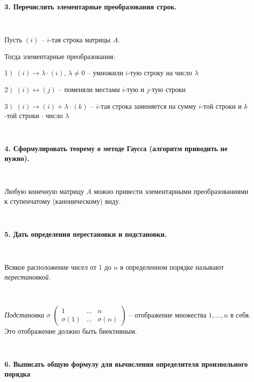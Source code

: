 \documentclass{article}
\begin{document}
    \textbf{3. Перечислить элементарные преобразования строк.}

    {
        $\;$
        \setlength{\parindent}{0.4cm}
        \hangindent=0.4cm

    Пусть $(i)$ -- $i$-тая строка матрицы $A$.

    Тогда элементарные преобразования:

    1$\left.\right)$ $(i)\rightarrow\lambda\cdot(i)$, $ \lambda\ne 0$ --
    умножили $i$-тую строку на число $\lambda$

        2$\left.\right)$ $(i)\leftrightarrow (j)$ -- поменяли местами $i$-тую и $j$-тую строки

    3$\left.\right)$ $(i)\rightarrow (i)+\lambda\cdot(k)$ -- $i$-тая строка заменяется на сумму $i$-той строки и $k$-той
    строки $\cdot$ число $\lambda$

        $\;$
        \setlength{\parindent}{0cm}
        \hangindent=0cm
    }

    \textbf{4. Сформулировать теорему о методе Гаусса (алгоритм приводить не нужно).}

    {
        $\;$
        \setlength{\parindent}{0.4cm}
        \hangindent=0.4cm

    Любую конечную матрицу $A$ можно привести элементарными преобразованиями к ступенчатому (каноническому) виду.

        $\;$
        \setlength{\parindent}{0cm}
        \hangindent=0cm
    }

    \textbf{5. Дать определения перестановки и подстановки.}

    {
        $\;$
        \setlength{\parindent}{0.4cm}
        \hangindent=0.4cm

    Всякое расположение чисел от 1 до $n$ в определенном порядке называют \textit{перестановкой}.

        $\;$

        \textit{Подстановка} $\sigma$ {\scriptsize $\begin{pmatrix}
                                                        1         & \ldots & n         \\
                                                        \sigma(1) & \ldots & \sigma(n)
    \end{pmatrix}$} -- отображение множества $1, \ldots, n$ в себя. Это отображение должно быть биективным.

        $\;$
        \setlength{\parindent}{0cm}
        \hangindent=0cm
    }


    \textbf{6. Выписать общую формулу для вычисления определителя произвольного порядка}
\end{document}
